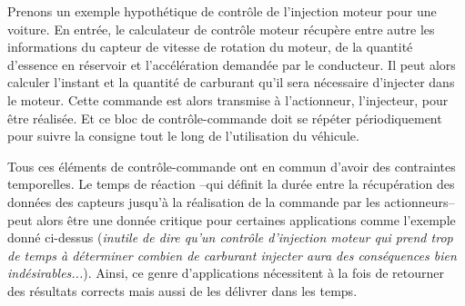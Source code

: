 \documentclass[french, a4paper, 11pt, twoside, pdftex]{StyleThese}
\begin{document}
		Prenons un exemple hypothétique de contrôle de l'injection moteur pour une voiture. En entrée, le calculateur de contrôle moteur récupère entre autre les informations du capteur de vitesse de rotation du moteur, de la quantité d'essence en réservoir et l'accélération demandée par le conducteur. Il peut alors calculer l'instant et la quantité de carburant qu'il sera nécessaire d'injecter dans le moteur. Cette commande est alors transmise à l'actionneur, l'injecteur, pour être réalisée. Et ce bloc de contrôle-commande doit se répéter périodiquement pour suivre la consigne tout le long de l'utilisation du véhicule.
		
		Tous ces éléments de contrôle-commande ont en commun d'avoir des contraintes temporelles. Le temps de réaction --qui définit la durée entre la récupération des données des capteurs jusqu'à la réalisation de la commande par les actionneurs--  peut alors être une donnée critique pour certaines applications comme l'exemple donné ci-dessus (\textit{inutile de dire qu'un contrôle d'injection moteur qui prend trop de temps à déterminer combien de carburant injecter aura des conséquences bien indésirables...}). Ainsi, ce genre d'applications nécessitent à la fois de retourner des résultats corrects mais aussi de les délivrer dans les temps. 
		
\end{document}
